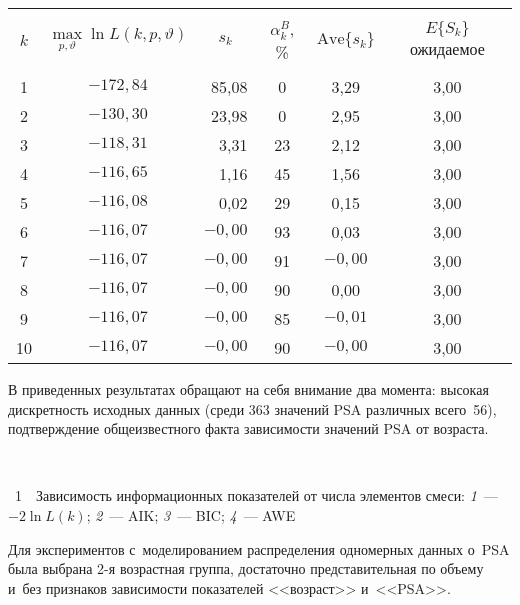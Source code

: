 \begin{multicols}{2}
\begin{table*}
\begin{center}
\begin{tabular}{|c|c|r|c|c|c|}
\hline
&&&&&\\[-9pt]
$k$&$\max\limits_{p,\vartheta} \ln L(k,p,\vartheta)$&
\multicolumn{1}{c|}{$s_k$}&$\alpha_k^B$,
\%&$\mathrm{Ave}\{s_k\}$&$E\{S_k\}$ ожидаемое\\
&&&&&\\[-9pt]
\hline
1&$-172{,}84$&85,08&\hphantom{9}0&3,29&3,00\\
2&$-130{,}30$&23,98&\hphantom{9}0&2,95&3,00\\
3&$-118{,}31$&3,31&23&2,12&3,00\\
4&$-116{,}65$&1,16&45&1,56&3,00\\
5&$-116{,}08$&0,02&29&0,15&3,00\\
6&$-116{,}07$&$-0{,}00$&93&0,03&3,00\\
7&$-116{,}07$&$-0{,}00$&91&$-0{,}00$\hphantom{$-$}&3,00\\
8&$-116{,}07$&$-0{,}00$&90&0,00&3,00\\
9&$-116{,}07$&$-0{,}00$&85&$-0{,}01$\hphantom{$-$}&3,00\\
10\hphantom{9}&$-116{,}07$&$-0{,}00$&90&$-0{,}00$\hphantom{$-$}&3,00\\
\hline
\end{tabular}
\end{center}
\vspace*{-6pt}
\end{table*}

     В приведенных результатах обращают на себя внимание два момента:
высокая дискретность исходных данных (среди 363 значений PSA различных
всего~56), подтверждение общеизвестного факта зависимости значений PSA от
возраста.
\begin{center}  %
\vspace*{6pt}
\mbox{%
 \epsfxsize=77.98mm
 }
\end{center}

\vspace*{3pt}

\noindent
{{\figurename~1}\ \ \small{Зависимость информационных показателей от числа элементов смеси:
\textit{1}~--- $-2\ln L(k)$; \textit{2}~--- AIK; \textit{3}~--- BIC; \textit{4}~--- AWE}}




\addtocounter{figure}{1}

     Для экспериментов с~моделированием распределения одномерных
данных о~PSA была выбрана 2-я возрастная группа, достаточно
представительная по объему и~без признаков зависимости показателей
<<возраст>> и~<<PSA>>.






\end{multicols}
